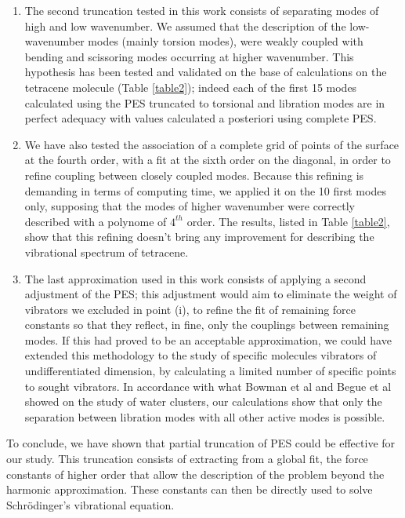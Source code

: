 \begin{enumerate}
	\item The second truncation tested in this work consists of separating modes of high and low wavenumber. We assumed that the description of the low-wavenumber modes (mainly torsion modes), were weakly coupled with bending and scissoring modes occurring at higher wavenumber.  This hypothesis has been tested and validated on the base of calculations on the tetracene molecule (Table \ref{table2}); indeed each of the first 15 modes calculated using the PES truncated to torsional and libration modes are in perfect adequacy with values calculated a posteriori using complete PES. 
	
	\item We have also tested the association of a complete grid of points of the surface at the fourth order, with a fit at the sixth order on the diagonal, in order to refine coupling between closely coupled modes. Because this refining is demanding in terms of computing time, we applied it on the 10 first modes only, supposing that the modes of higher wavenumber were correctly described with a polynome of $4^{th}$ order. The results, listed in Table \ref{table2}, show that this refining doesn’t bring any improvement for describing the vibrational spectrum of tetracene.
	
	\item The last approximation used in this work consists of applying a second adjustment of the PES; this adjustment would aim to eliminate the weight of vibrators we excluded in point (i), to refine the fit of remaining force constants so that they reflect, in fine, only the couplings between remaining modes. If this had proved to be an acceptable approximation, we could have extended this methodology to the study of specific molecules vibrators of undifferentiated dimension, by calculating a limited number of specific points to sought vibrators. In accordance with what Bowman et al \cite{bowman2008variational} and Begue et al \cite{begue2010calculation}  showed on the study of water clusters, our calculations show that only the separation between libration modes with all other active modes is possible.
	
\end{enumerate}

To conclude, we have shown that partial truncation of PES could be effective for our study. This truncation consists of extracting from a global fit, the force constants of higher order that allow the description of the problem beyond the harmonic approximation. These constants can then be directly used to solve Schr\"{o}dinger's vibrational equation.

